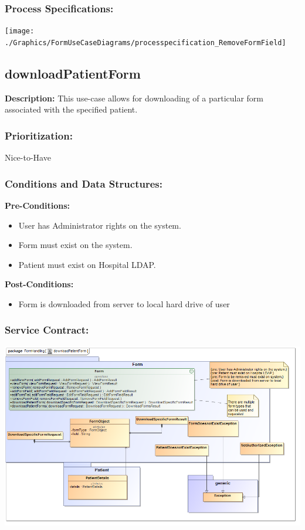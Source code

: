 \subsubsection{Process Specifications:} 
\texttt{[image: ./Graphics/FormUseCaseDiagrams/processpecification\_RemoveFormField]}




\subsection{downloadPatientForm} %
\textbf{Description:}
This use-case allows for downloading of a particular form associated with the specified patient.
\subsubsection{Prioritization:}
Nice-to-Have
\subsubsection{Conditions and Data Structures:}
\textbf{Pre-Conditions:}
\begin{itemize}
	\item User has Administrator rights on the system.
	\item Form must exist on the system.
	\item Patient must exist on Hospital LDAP.
\end{itemize}

\textbf{Post-Conditions:}	
\begin{itemize}
	\item Form is downloaded from server to local hard drive of user
\end{itemize}
\subsubsection{Service Contract:} 
\includegraphics[width=1\linewidth]{./Graphics/FormUseCaseDiagrams/downloadPatientForm}
